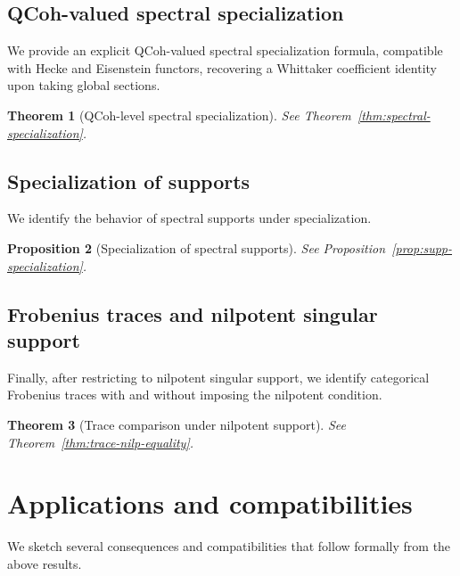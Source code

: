 \documentclass[11pt]{article}
\theoremstyle{plain}
\newtheorem{theorem}{Theorem}[section]
\newtheorem{proposition}[theorem]{Proposition}
\theoremstyle{definition}
\theoremstyle{remark}
\begin{document}


\subsection{QCoh-valued spectral specialization}
We provide an explicit QCoh-valued spectral specialization formula, compatible with Hecke and Eisenstein functors, recovering a Whittaker coefficient identity upon taking global sections.

\begin{theorem}[QCoh-level spectral specialization] \label{thm:intro:spectral-qcoh}
See Theorem~\ref{thm:spectral-specialization}.
\end{theorem}



\subsection{Specialization of supports}
We identify the behavior of spectral supports under specialization.

\begin{proposition}[Specialization of spectral supports] \label{prop:intro:supp}
See Proposition~\ref{prop:supp-specialization}.
\end{proposition}



\subsection{Frobenius traces and nilpotent singular support}
Finally, after restricting to nilpotent singular support, we identify categorical Frobenius traces with and without imposing the nilpotent condition.

\begin{theorem}[Trace comparison under nilpotent support] \label{thm:intro:trace}
See Theorem~\ref{thm:trace-nilp-equality}.
\end{theorem}



\section{Applications and compatibilities}\label{sec:applications}
We sketch several consequences and compatibilities that follow formally from the above results.
\end{document}
